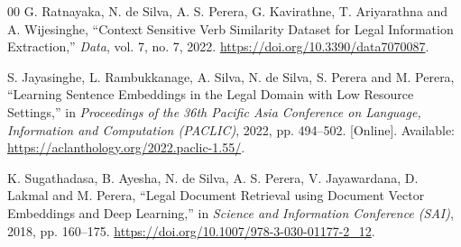 \documentclass[11pt,a4paper]{article}
\begin{document}
\begin{thebibliography}{00}
G. Ratnayaka, N. de Silva, A. S. Perera, G. Kavirathne, T. Ariyarathna and A. Wijesinghe,
``Context Sensitive Verb Similarity Dataset for Legal Information Extraction,''
\emph{Data}, vol. 7, no. 7, 2022. \url{https://doi.org/10.3390/data7070087}.

S. Jayasinghe, L. Rambukkanage, A. Silva, N. de Silva, S. Perera and M. Perera,
``Learning Sentence Embeddings in the Legal Domain with Low Resource Settings,'' in
\emph{Proceedings of the 36th Pacific Asia Conference on Language, Information and
Computation (PACLIC)}, 2022, pp. 494--502. [Online]. Available:
\url{https://aclanthology.org/2022.paclic-1.55/}.

K. Sugathadasa, B. Ayesha, N. de Silva, A. S. Perera, V. Jayawardana, D. Lakmal and
M. Perera, ``Legal Document Retrieval using Document Vector Embeddings and Deep
Learning,'' in \emph{Science and Information Conference (SAI)}, 2018, pp. 160--175.
\url{https://doi.org/10.1007/978-3-030-01177-2_12}.

\end{thebibliography}
\end{document}
